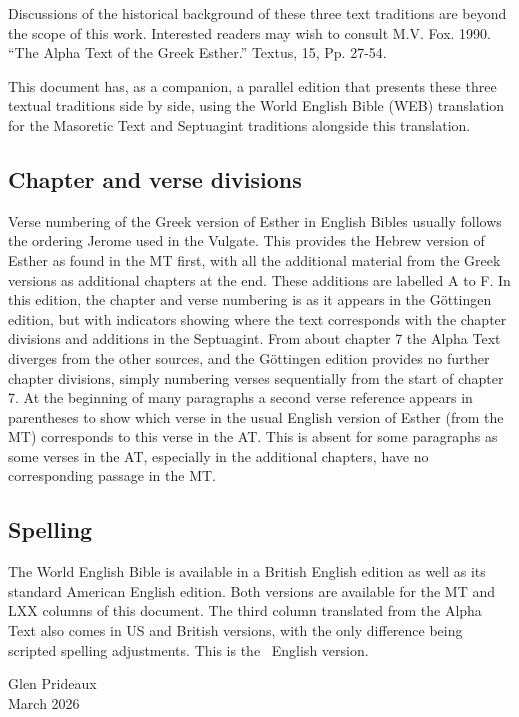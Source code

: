 {Discussions of the historical background of these three text traditions are beyond the scope of this work. Interested readers may wish to consult M.V. Fox. 1990. “The Alpha Text of the Greek Esther.” Textus, 15, Pp. 27-54.

This document has, as a companion, a parallel edition that presents these three textual traditions side by side, using the World English Bible (WEB) translation for the Masoretic Text and Septuagint traditions alongside this translation.

\subsection*{Chapter and verse divisions}

Verse numbering of the Greek version of Esther in English Bibles usually follows the ordering Jerome used in the Vulgate. This provides the Hebrew version of Esther as found in the MT first, with all the additional material from the Greek versions as additional chapters at the end. These additions are labelled A to F. In this edition, the chapter and verse numbering is as it appears in the Göttingen edition, but with indicators showing where the text corresponds with the chapter divisions and additions in the Septuagint. From about chapter 7 the Alpha Text diverges from the other sources, and the Göttingen edition provides no further chapter divisions, simply numbering verses sequentially from the start of chapter 7. At the beginning of many paragraphs a second verse reference appears in parentheses to show which verse in the usual English version of Esther (from the MT) corresponds to this verse in the AT. This is absent for some paragraphs as some verses in the AT, especially in the additional chapters, have no corresponding passage in the MT.

\subsection*{Spelling}
The World English Bible is available in a British English edition as well as its standard American English edition. Both versions are available for the MT and LXX columns of this document. The third column translated from the Alpha Text also comes in US and British versions, with the only difference being scripted spelling adjustments. This is the \fi\ English version.

\bigskip
\noindent Glen Prideaux\\
March 2026
}